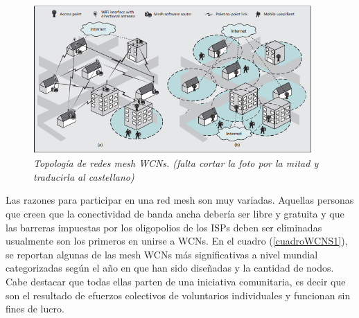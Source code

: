 \begin{figure}[th]	
	\centering	
	\includegraphics[width=0.95\textwidth]{./figures/WCNs1}		
	\caption{\textit{Topología de redes mesh WCNs. (falta cortar la foto por la mitad y traducirla al castellano)}}
	\label{MWCNfigura1}
\end{figure}



Las razones para participar en una red mesh son muy variadas. Aquellas personas que creen que la conectividad de banda ancha debería ser libre y gratuita y que las barreras impuestas por los oligopolios de los ISPs deben ser eliminadas usualmente son los primeros en unirse a WCNs. En el cuadro (\ref{cuadroWCNS1}), se reportan algunas de las mesh WCNs más significativas a nivel mundial categorizadas según el año en que han sido diseñadas y la cantidad de nodos. Cabe destacar que todas ellas parten de una iniciativa comunitaria, es decir que son el resultado de efuerzos colectivos de voluntarios individuales y funcionan sin fines de lucro.

